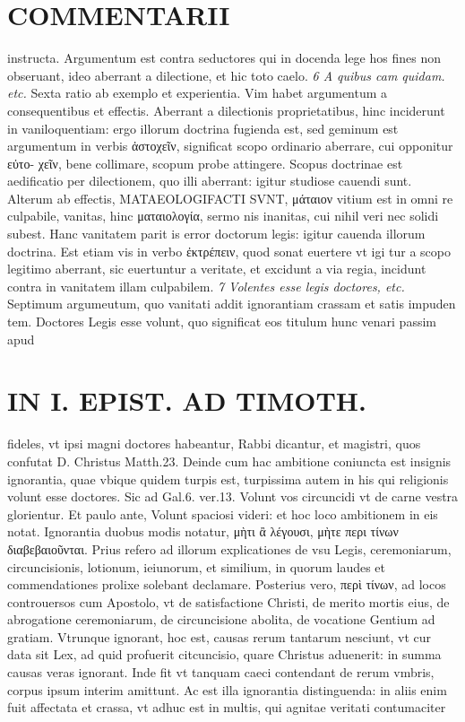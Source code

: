 \documentclass{article}
\begin{document}
\begin{pages}
\section*{COMMENTARII }
\marginpar{[ p.24 ]}\pstart instructa. Argumentum est contra seductores qui in docenda lege hos fines non obseruant, ideo aberrant a dilectione, et hic toto caelo.  \pend
\textit{6 A quibus cam quidam. etc. }\pstart Sexta ratio ab exemplo et experientia. Vim habet argumentum a consequentibus et effectis. Aberrant a dilectionis proprietatibus, hinc inciderunt in vaniloquentiam: ergo illorum doctrina fugienda est, sed geminum est argumentum in verbis ἀστοχεῖν, significat scopo ordinario aberrare, cui opponitur εὐτο- χεῖν, bene collimare, scopum probe attingere. Scopus doctrinae est aedificatio per dilectionem, quo illi aberrant: igitur studiose cauendi sunt. Alterum ab effectis, MATAEOLOGIFACTI SVNT, μάταιον vitium est in omni re culpabile, vanitas, hinc ματαιολογία, sermo nis inanitas, cui nihil veri nec solidi subest. Hanc vanitatem parit is error doctorum legis: igitur cauenda illorum doctrina. Est etiam vis in verbo ἐκτρέπειν, quod sonat euertere vt igi tur a scopo legitimo aberrant, sic euertuntur a veritate, et excidunt a via regia, incidunt contra in vanitatem illam culpabilem.  \pend
\textit{7 Volentes esse legis doctores, etc. }\pstart Septimum argumeutum, quo vanitati addit ignorantiam crassam et satis impuden tem. Doctores Legis esse volunt, quo significat eos titulum hunc venari passim apud  \pend
\section*{IN I. EPIST. AD TIMOTH. }
\marginpar{[ p.25 ]}\pstart fideles, vt ipsi magni doctores habeantur, Rabbi dicantur, et magistri, quos confutat D. Christus Matth.23. Deinde cum hac ambitione coniuncta est insignis ignorantia, quae vbique quidem turpis est, turpissima autem in his qui religionis volunt esse doctores. Sic ad Gal.6. ver.13. Volunt vos circuncidi vt de carne vestra glorientur. Et paulo ante, Volunt spaciosi videri: et hoc loco ambitionem in eis notat. Ignorantia duobus modis notatur, μὴτι ἂ λέγουσι, μὴτε περι τίνων διαβεβαιοῦνται. Prius refero ad illorum explicationes de vsu Legis, ceremoniarum, circuncisionis, lotionum, ieiunorum, et similium, in quorum laudes et commendationes prolixe solebant declamare. Posterius vero, περὶ τίνων, ad locos controuersos cum Apostolo, vt de satisfactione Christi, de merito mortis eius, de abrogatione ceremoniarum, de circuncisione abolita, de vocatione Gentium ad gratiam. Vtrunque ignorant, hoc est, causas rerum tantarum nesciunt, vt cur data sit Lex, ad quid profuerit citcuncisio, quare Christus aduenerit: in summa causas veras ignorant.  \pend\pstart Inde fit vt tanquam caeci contendant de rerum vmbris, corpus ipsum interim amittunt. Ac est illa ignorantia distinguenda: in aliis enim fuit affectata et crassa, vt adhuc est in multis, qui agnitae veritati contumaciter  \pend

\end{pages}
\end{document}
